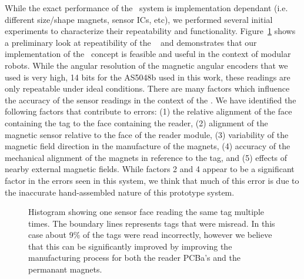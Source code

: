 While the exact performance of the \tagName~system is implementation dependant (i.e. different size/shape magnets, sensor ICs, etc), we performed several initial experiments to characterize their repeatability and functionality. Figure~\ref{fig:histogram} shows a preliminary look at repeatibility of the \tagNamePlural~ and demonstrates that our implementation of the \tagName~concept is feasible and useful in the context of modular robots. While the angular resolution of the magnetic angular encoders that we used is very high, 14 bits for the AS5048b used in this work, these readings are only repeatable under ideal conditions. There are many factors which influence the accuracy of the sensor readings in the context of the \tagNamePlural. We have identified the following factors that contribute to errors: (1) the relative alignment of the face containing the tag to the face containing the reader, (2) alignment of the magnetic sensor relative to the face of the reader module, (3) variability of the magnetic field direction in the manufacture of the magnets, (4) accuracy of the mechanical alignment of the magnets in reference to the tag, and (5) effects of nearby external magnetic fields. While factors 2 and 4 appear to be a significant factor in the errors seen in this system, we think that much of this error is due to the inaccurate hand-assembled nature of this prototype system.

\begin{figure}[h]
	
	\caption{Histogram showing one sensor face reading the same tag multiple times. The boundary lines represents tags that were misread. In this case about 9\% of the tags were read incorrectly, however we believe that this can be significantly improved by improving the manufacturing process for both the reader PCBa's and the permanant magnets.}
	\label{fig:histogram}
\end{figure}


%	
